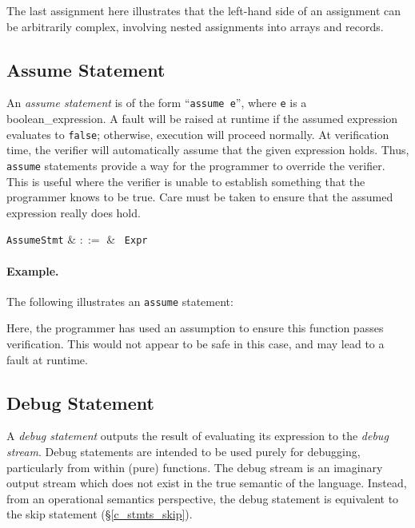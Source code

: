 

The last assignment here illustrates that the left-hand side of an assignment can be arbitrarily complex, involving nested assignments into arrays and records.


\subsection{Assume Statement}

An {\em assume statement} is of the form ``\lstinline{assume e}'', where \lstinline{e} is a \gls{boolean_expression}.  A \gls{fault} will be raised at runtime if the assumed expression evaluates to \lstinline{false}; otherwise, execution will proceed normally.  At verification time, the verifier will automatically assume that the given expression holds.  Thus, \lstinline{assume} statements provide a way for the programmer to override the verifier.  This is useful where the verifier is unable to establish something that the programmer knows to be true.  Care must be taken to ensure that the assumed expression really does hold.

\begin{syntax}
  \verb+AssumeStmt+ & $::=$ & \ \verb+Expr+\\
\end{syntax}

\paragraph{Example.} The following illustrates an \lstinline{assume} statement:



Here, the programmer has used an assumption to ensure this function passes verification.  This would not appear to be safe in this case, and may lead to a fault at runtime.



\subsection{Debug Statement}
A {\em debug statement} outputs the result of evaluating its expression to the {\em debug stream}.  Debug statements are intended to be used purely for debugging, particularly from within (pure) functions.  The debug stream is an imaginary output stream which does not exist in the true semantic of the language.  Instead, from an operational semantics perspective, the debug statement is equivalent to the skip statement (\S\ref{c_stmts_skip}).

